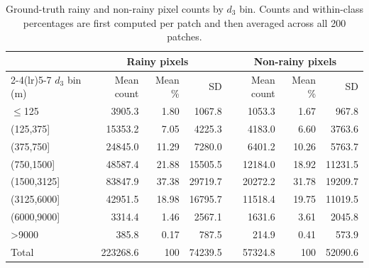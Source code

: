 \begin{table}[!htbp]\centering\small\setlength{\tabcolsep}{3pt}\begin{tabular*}{\textwidth}{@{\extracolsep{\fill}}lrrrrrr@{}}
\toprule & \multicolumn{3}{c}{Rainy pixels} & \multicolumn{3}{c}{Non-rainy pixels} \\
\cmidrule(lr){2-4}\cmidrule(lr){5-7}
$d_3$ bin (m) & Mean count & Mean \% & SD & Mean count & Mean \% & SD \\
\midrule
$\leq$125 & 3905.3 & 1.80 & 1067.8 & 1053.3 & 1.67 & 967.8 \\
(125,375] & 15353.2 & 7.05 & 4225.3 & 4183.0 & 6.60 & 3763.6 \\
(375,750] & 24845.0 & 11.29 & 7280.0 & 6401.2 & 10.26 & 5763.7 \\
(750,1500] & 48587.4 & 21.88 & 15505.5 & 12184.0 & 18.92 & 11231.5 \\
(1500,3125] & 83847.9 & 37.38 & 29719.7 & 20272.2 & 31.78 & 19209.7 \\
(3125,6000] & 42951.5 & 18.98 & 16795.7 & 11518.4 & 19.75 & 11019.5 \\
(6000,9000] & 3314.4 & 1.46 & 2567.1 & 1631.6 & 3.61 & 2045.8 \\
>9000 & 385.8 & 0.17 & 787.5 & 214.9 & 0.41 & 573.9 \\
\midrule Total & 223268.6 & 100 & 74239.5 & 57324.8 & 100 & 52090.6 \\
\bottomrule\end{tabular*}
\caption{Ground-truth rainy and non-rainy pixel counts by $d_3$ bin. Counts and within-class percentages are first computed per patch and then averaged across all 200 patches.}
\label{tab:rainy_nonrain_counts}
\end{table}
